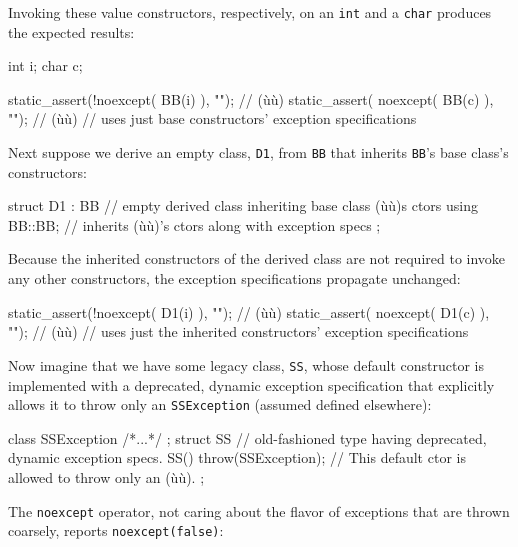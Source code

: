 \noindent Invoking these value constructors, respectively, on an \lstinline!int! and
a \lstinline!char! produces the expected results:

\begin{emcppslisting}[emcppsbatch=e7]
int i;
char c;

static_assert(!noexcept( BB(i) ), "");  // (ù{}ù)
static_assert( noexcept( BB(c) ), "");  // (ù{}ù)
    // uses just base constructors' exception specifications
\end{emcppslisting}
    

\noindent Next suppose we derive an empty class, \lstinline!D1!, from \lstinline!BB!
that inherits \lstinline!BB!'s base class's constructors:

\begin{emcppslisting}[emcppsbatch=e7]
struct D1 : BB  // empty derived class inheriting base class (ù{}ù)s ctors
{
    using BB::BB;  // inherits (ù{}ù)'s ctors along with exception specs
};
\end{emcppslisting}
    

\noindent Because the inherited constructors of the derived class are not required
to invoke any other constructors, the exception specifications propagate
unchanged:

\begin{emcppslisting}[emcppsbatch=e7]
static_assert(!noexcept( D1(i) ), "");  // (ù{}ù)
static_assert( noexcept( D1(c) ),  "");  // (ù{}ù)
    // uses just the inherited constructors' exception specifications
\end{emcppslisting}
    

\noindent Now imagine that we have some legacy class, \lstinline!SS!, whose default
constructor is implemented with a deprecated, dynamic exception
specification that explicitly allows it to throw only an
\lstinline!SSException! (assumed defined elsewhere):

\begin{emcppslisting}[emcppsbatch=e7]
class SSException { /*...*/ };
struct SS  // old-fashioned type having deprecated, dynamic exception specs.
{
    SS() throw(SSException);  // This default ctor is allowed to throw only an (ù{}ù).
};
\end{emcppslisting}
    

\noindent The \lstinline!noexcept! operator, not caring about the flavor of
exceptions that are thrown coarsely, reports \lstinline!noexcept(false)!:

